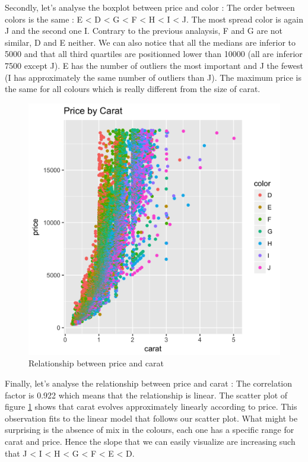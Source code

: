 \documentclass{article}
\begin{document}
Secondly, let's analyse the boxplot between price and color : 
The order between colors is the same : E < D < G < F < H < I < J.
The most spread color is again J and the second one I. Contrary to the previous analaysis, F and G are not similar, D and E neither. 
We can also notice that all the medians are inferior to 5000 and that all third quartiles are positionned lower than 10000 (all are inferior 7500 except J).
E has the number of outliers the most important and J the fewest (I has approximately the same number of outliers than J). The maximum price is the same for all colours which is really different from the size of carat. 

\begin{figure}[!ht]
\centering
\includegraphics[width=.5\textwidth]{pricebycarat.png}
 \caption{Relationship between price and carat}
\label{pricebycarat}
\end{figure}

Finally, let's analyse the relationship between price and carat : 
The correlation factor is 0.922 which means that the relationship is linear.
The scatter plot of figure \ref{pricebycarat} shows that carat evolves approximately linearly according to price. This observation fits to the linear model that follows our scatter plot. What might be surprising is the absence of mix in the colours, each one has a specific range for carat and price. Hence the slope that we can easily visualize are increasing such that J < I < H < G < F < E < D.
\end{document}
